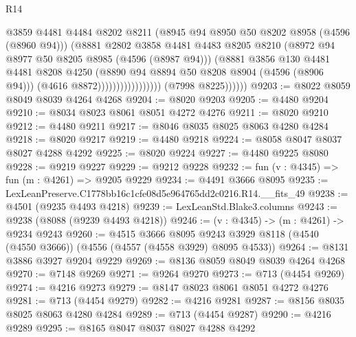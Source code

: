 \begin{lexlean}{R14}
\begin{coremodule}
                                          @3859
                                          @4481
                                          @4484
                                          @8202
                                          @8211
                                          (@8945 @94 @8950 @50 @8202 @8958 (@4596 (@8960 @94)))
                                          (@8881
                                            @2802
                                            @3858
                                            @4481
                                            @4483
                                            @8205
                                            @8210
                                            (@8972 @94 @8977 @50 @8205 @8985 (@4596 (@8987 @94)))
                                            (@8881
                                              @3856
                                              @130
                                              @4481
                                              @4481
                                              @8208
                                              @4250
                                              (@8890 @94 @8894 @50 @8208 @8904 (@4596 (@8906 @94)))
                                              (@4616 @8872)))))))))))))))))
              (@7998 @8225))))))
@9203 := @8022 @8059 @8049 @8039 @4264 @4268
@9204 := @8020 @9203
@9205 := @4480 @9204
@9210 := @8034 @8023 @8061 @8051 @4272 @4276
@9211 := @8020 @9210
@9212 := @4480 @9211
@9217 := @8046 @8035 @8025 @8063 @4280 @4284
@9218 := @8020 @9217
@9219 := @4480 @9218
@9224 := @8058 @8047 @8037 @8027 @4288 @4292
@9225 := @8020 @9224
@9227 := @4480 @9225 @8080
@9228 := @9219 @9227
@9229 := @9212 @9228
@9232 := fun (v : @4345) => fun (m : @4261) => @9205 @9229
@9234 := @4491 @3666 @8095
@9235 := LexLeanPreserve.C1778bb16c1cfe08d5e964765dd2c0216.R14.__fits_49
@9238 := @4501 (@9235 @4493 @4218)
@9239 := LexLeanStd.Blake3.columns
@9243 := @9238 (@8088 (@9239 @4493 @4218))
@9246 := (v : @4345) -> (m : @4261) -> @9234 @9243
@9260 := @4515
    @3666
    @8095
    @9243
    @3929
    @8118
    (@4540 (@4550 @3666))
    (@4556 (@4557 (@4558 @3929) @8095 @4533))
@9264 := @8131 @3886 @3927 @9204 @9229
@9269 := @8136 @8059 @8049 @8039 @4264 @4268
@9270 := @7148 @9269
@9271 := @9264 @9270
@9273 := @713 (@4454 @9269)
@9274 := @4216 @9273
@9279 := @8147 @8023 @8061 @8051 @4272 @4276
@9281 := @713 (@4454 @9279)
@9282 := @4216 @9281
@9287 := @8156 @8035 @8025 @8063 @4280 @4284
@9289 := @713 (@4454 @9287)
@9290 := @4216 @9289
@9295 := @8165 @8047 @8037 @8027 @4288 @4292

\end{coremodule}
\end{lexlean}
